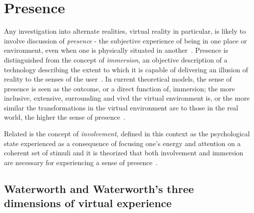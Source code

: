

\section{Presence}
\label{lit-review-presencec}
Any investigation into alternate realities, virtual reality in particular, is likely to involve discussion of \textit{presence} - the subjective experience of being in one place or environment, even when one is physically situated in another~\cite{Witmer1998}. Presence is distinguished from the concept of \textit{immersion}, an objective description of a technology describing the extent to which it is capable of delivering an illusion of reality to the senses of the user~\cite{Slater1997}. In current theoretical models, the sense of presence is seen as the outcome, or a direct function of, immersion; the more inclusive, extensive, surrounding and vivd the virtual environment is, or the more similar the transformations in the virtual environment are to those in the real world, the higher the sense of presence~\cite{Constantin2003}.

Related is the concept of \textit{involvement}, defined in this context as the psychological state experienced as a consequence of focusing one's energy and attention on a coherent set of stimuli and it is theorized that both involvement and immersion are necessary for experiencing a sense of presence~\cite{Witmer1998}.

\subsection{Waterworth and Waterworth's three dimensions of virtual experience}
\label{waterworthandwaterworth}
\newcommand{\presencefootnote}{\footnote{\textbf{Presence} in the context of this model is defined as a state of heightened perceptual processing of environmental stimuli (\textit{``a psychological focus on direct perceptual processing''}~\cite{Waterworth2001}) accompanied by lessened conceptual reasoning, whether these environmental stimuli originate from a real environment, a virtual environment, a mixed reality environment, or even from multiple discrete environments.}}

\newcommand{\absencefootnote}{\footnote{\textbf{Absence} is defined as \textit{``a psychological focus on \ldots\ conceptual processing''}~\cite{Waterworth2001}.}}

